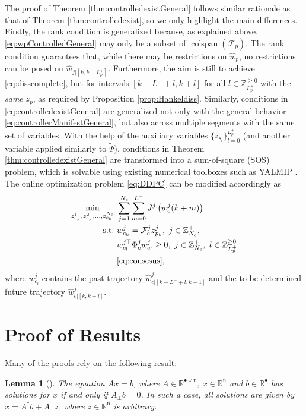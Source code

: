 \documentclass[11pt,print,draftcls,onecolumn,romanappendices]{ieeecolor}
\newtheorem{lem}[thm]{Lemma}
\DeclareMathOperator{\cs}{colspan}
\newcommand{\R}{\mathbb{R}}
\newcommand{\Zp}[1]{\mathbb{Z}^+_{#1}}
\newcommand{\Znn}[1]{\mathbb{Z}^{\geq0}_{#1}}
\newcommand{\revise}[1]{{\color{black} #1}}
\newcommand{\F}{\mathcal{F}}
\newcommand{\bint}[1]{{|[#1]}}
\begin{document}
{The proof of Theorem \ref{thm:controlledexistGeneral} follows similar rationale as that of Theorem \ref{thm:controlledexist}, so we only highlight the main differences. Firstly, the rank condition is generalized because, as explained above, \eqref{eq:wpControlledGeneral} may only be a subset of $\cs(\F_p)$. The rank condition guarantees that, while there may be restrictions on $\hat{w}_p$, no restrictions can be posed on $\hat{w}_{f\bint{k,k+L_p^+}}$. Furthermore, the aim is still to achieve \eqref{eq:disscomplete}, but for intervals $[k-L^-+l,k+l]$ for all $l\in\Znn{L_p^+}$ with the \emph{same} $z_p$, as required by Proposition \ref{prop:Hankeldiss}. Similarly, conditions in \eqref{eq:controlledexistGeneral} are generalized not only with the general behavior \eqref{eq:controllerManifestGeneral}, but also across multiple segments with the same set of variables. With the help of the auxiliary variables $\{z_{s_l}\}_{l=0}^{L_p^+}$ (and another variable applied similarly to $\widetilde{\Psi}$), conditions in Theorem \ref{thm:controlledexistGeneral} are transformed into a sum-of-square (SOS) problem, which is solvable using existing numerical toolboxes such as YALMIP \cite{Lofberg:2004}. The online optimization problem \eqref{eq:DDPC} can be modified accordingly as
\begin{equation}\label{eq:DDPCGeneral}
	\begin{split}
		\min_{z_{c_k}^1,z_{c_k}^2,\ldots,z_{c_k}^{N_c}} \ &\sum_{j=1}^{N_c}\sum_{m=0}^{L^+}{\revise{J^j}}\left(w_{c}^j(k+m)\right)\\
		\mathrm{s.t.} \ & \bar{w}_{c_k}^j=\F_c^jz_{p_k}^j,\ j\in\Zp{N_c},\\
		& \bar{w}_{c_l}^{j\top}\Phi_c^j\bar{w}_{c_l}^j\geq0, \ j\in\Zp{N_c}, \ l\in\Znn{L_p^+}\\
		& \eqref{eq:consesus},
	\end{split}  
\end{equation}
where $\bar{w}_{c_l}^j$ contains the past trajectory $\hat{w}_{c\bint{k-L^-+l,k-1}}^j$ and the to-be-determined future trajectory $\hat{w}_{c\bint{k,k-l}}^j$. 
}
\section{Proof of Results}
Many of the proofs rely on the following result:
\begin{lem}[\cite{Skelton:1997}]\label{lem:Ax=b}
	The equation $Ax=b$, where $A\in\R^{\bullet\times\mathrm{n}}$, $x\in\R^\mathrm{n}$ and $b\in\R^{\bullet}$ has solutions for $x$ if and only if $A_\perp b=0$. In such a case, all solutions are given by $x=A^\dagger b+A^{\perp}z$, where $z\in \R^\mathrm{n}$ is arbitrary.
\end{lem}
\end{document}
